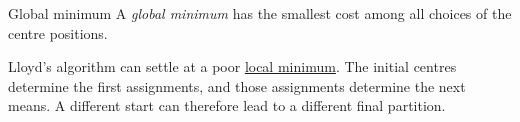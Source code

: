 \documentclass[a4paper,12pt,oneside]{report}
\begin{document}
\begin{frameddefn}{Global minimum}
\label{def:kmeans-global-minimum}
A \emph{global minimum} has the smallest cost among all choices of
the centre positions.
\end{frameddefn}

Lloyd's algorithm can settle at a poor
\hyperref[def:kmeans-local-minimum]{local minimum}. The initial centres
determine the first assignments, and those assignments determine the
next means. A different start can therefore lead to a different final
partition.

\newcommand{\rectangleaxes}{%
  \draw[gray!20] (0,0) grid (4,2);
  \draw[->,gray!80!black] (-0.25,0) -- (4.7,0)
    node[right] {$x_1$};
  \draw[->,gray!80!black] (0,-0.2) -- (0,2.7)
    node[above] {$x_2$};
  \foreach \x in {1,2,3,4}{
    \draw[gray!80!black] (\x,0.06) -- (\x,-0.06);
    \node[font=\small,below=3pt] at (\x,0) {$\x$};}
  \foreach \y in {1,2}{
    \draw[gray!80!black] (0.06,\y) -- (-0.06,\y);
    \node[font=\small,left=3pt] at (0,\y) {$\y$};}}
\end{document}

